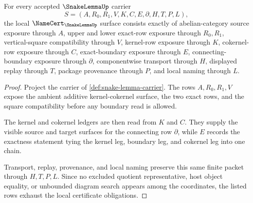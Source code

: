 \begin{theorem}
\label{thm:snake-lemma-namecert-obligations}
For every accepted $\SnakeLemmaUp$ carrier
$$
S=(A,R_0,R_1,V,K,C,E,\partial,H,T,P,L),
$$
the local $\NameCert_{\SnakeLemmaUp}$ surface consists exactly of abelian-category source exposure through $A$, upper and lower exact-row exposure through $R_0,R_1$, vertical-square compatibility through $V$, kernel-row exposure through $K$, cokernel-row exposure through $C$, exact-boundary exposure through $E$, connecting-boundary exposure through $\partial$, componentwise transport through $H$, displayed replay through $T$, package provenance through $P$, and local naming through $L$.
\end{theorem}
\begin{proof}
Project the carrier of \autoref{def:snake-lemma-carrier}. The rows $A,R_0,R_1,V$ expose the ambient additive kernel-cokernel surface, the two exact rows, and the square compatibility before any boundary read is allowed.

The kernel and cokernel ledgers are then read from $K$ and $C$. They supply the visible source and target surfaces for the connecting row $\partial$, while $E$ records the exactness statement tying the kernel leg, boundary leg, and cokernel leg into one chain.

Transport, replay, provenance, and local naming preserve this same finite packet through $H,T,P,L$. Since no excluded quotient representative, host object equality, or unbounded diagram search appears among the coordinates, the listed rows exhaust the local certificate obligations.
\end{proof}

